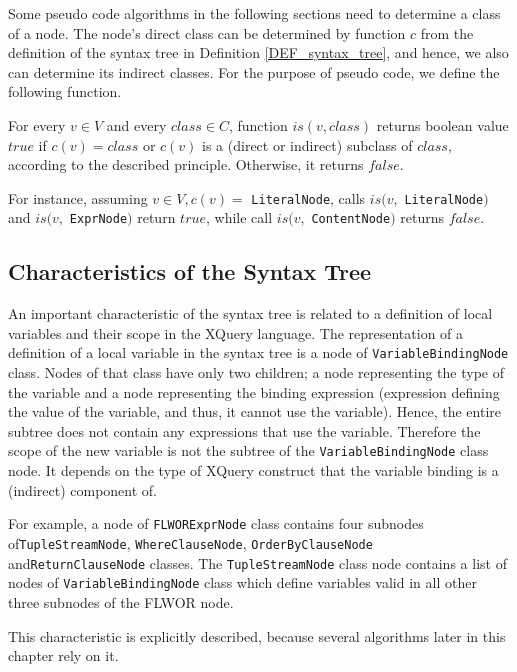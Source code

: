 Some pseudo code algorithms in the following sections need to determine a class of a node. The node's direct class can be determined by function $c$ from the definition of the syntax tree in Definition \ref{DEF_syntax_tree}, and hence, we also can determine its indirect classes. For the purpose of pseudo code, we define the following function.

\begin{define}For every $v \in V$ and every $class \in C$, function $is(v, class)$ returns boolean value $true$ if $c(v) = class$ or $c(v)$ is a (direct or indirect) subclass of $class$, according to the described principle. Otherwise, it returns $false$.
\end{define}

For instance, assuming $v \in V, c(v) =$ \texttt{LiteralNode}, calls $is(v,$ \texttt{LiteralNode}$)$ and $is(v,$ \texttt{ExprNode}$)$ return $true$, while call $is(v,$ \texttt{ContentNode}$)$ returns $false$.

\subsection{Characteristics of the Syntax Tree}
An important characteristic of the syntax tree is related to a definition of local variables and their scope in the XQuery language. The representation of a definition of a local variable in the syntax tree is a node of \texttt{VariableBindingNode} class. Nodes of that class have only two children; a node representing the type of the variable and a node representing the binding expression (expression defining the value of the variable, and thus, it cannot use the variable). Hence, the entire subtree does not contain any expressions that use the variable. Therefore the scope of the new variable is not the subtree of the \texttt{VariableBindingNode} class node. It depends on the type of XQuery construct that the variable binding is a (indirect) component of.

For example, a node of \texttt{FLWORExprNode} class contains four subnodes of\linebreak \texttt{TupleStreamNode}, \texttt{WhereClauseNode}, \texttt{OrderByClauseNode} and\linebreak \texttt{ReturnClauseNode} classes. The \texttt{TupleStreamNode} class node contains a list of nodes of \texttt{VariableBindingNode} class which define variables valid in all other three subnodes of the FLWOR node.

This characteristic is explicitly described, because several algorithms later in this chapter rely on it.

